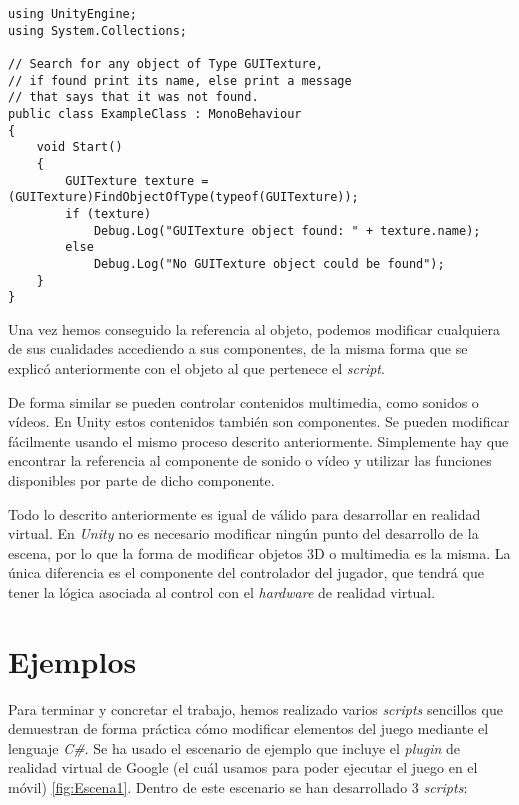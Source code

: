 \documentclass{pre-tfg}
\begin{document}
\begin{spacing}{1}
\begin{lstlisting}[float=htbp, caption=Búsqueda de objetos por tipo, label=lst:tipo]
using UnityEngine;
using System.Collections;

// Search for any object of Type GUITexture,
// if found print its name, else print a message
// that says that it was not found.
public class ExampleClass : MonoBehaviour
{
    void Start()
    {
        GUITexture texture = (GUITexture)FindObjectOfType(typeof(GUITexture));
        if (texture)
            Debug.Log("GUITexture object found: " + texture.name);
        else
            Debug.Log("No GUITexture object could be found");
    }
}
\end{lstlisting}
\end{spacing}

Una vez hemos conseguido la referencia al objeto, podemos modificar cualquiera de sus cualidades accediendo a sus componentes, de la misma forma que se explicó anteriormente con el objeto al que pertenece el \textit{script}. 

De forma similar se pueden controlar contenidos multimedia, como sonidos o vídeos. En Unity estos contenidos también son componentes. Se pueden modificar fácilmente usando el mismo proceso descrito anteriormente. Simplemente hay que encontrar la referencia al componente de sonido o vídeo y utilizar las funciones disponibles por parte de dicho componente.

Todo lo descrito anteriormente es igual de válido para desarrollar en realidad virtual. En \textit{Unity} no es necesario modificar ningún punto del desarrollo de la escena, por lo que la forma de modificar objetos 3D o multimedia es la misma. La única diferencia es el componente del controlador del jugador, que tendrá que tener la lógica asociada al control con el \textit{hardware} de realidad virtual.

\section{Ejemplos}

Para terminar y concretar el trabajo, hemos realizado varios \textit{scripts} sencillos que demuestran de forma práctica cómo modificar elementos del juego mediante el lenguaje \textit{C\#}. Se ha usado el escenario de ejemplo que incluye el \textit{plugin} de realidad virtual de Google (el cuál usamos para poder ejecutar el juego en el móvil) \ref{fig:Escena1}. Dentro de este escenario se han desarrollado 3 \textit{scripts}:
\end{document}

